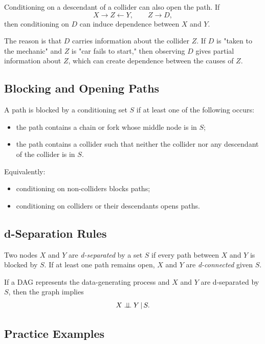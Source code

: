 Conditioning on a descendant of a collider can also open the path. If
\[
X\to Z\leftarrow Y,\qquad Z\to D,
\]
then conditioning on $D$ can induce dependence between $X$ and $Y$.

The reason is that $D$ carries information about the collider $Z$. If $D$ is "taken to the mechanic" and $Z$ is "car fails to start," then observing $D$ gives partial information about $Z$, which can create dependence between the causes of $Z$.

\subsection{Blocking and Opening Paths}

A path is blocked by a conditioning set $S$ if at least one of the following occurs:
\begin{itemize}
  \item the path contains a chain or fork whose middle node is in $S$;
  \item the path contains a collider such that neither the collider nor any descendant of the collider is in $S$.
\end{itemize}

Equivalently:
\begin{itemize}
  \item conditioning on non-colliders blocks paths;
  \item conditioning on colliders or their descendants opens paths.
\end{itemize}

\subsection{d-Separation Rules}

\begin{definition}[d-separation]
Two nodes $X$ and $Y$ are \emph{d-separated} by a set $S$ if every path between $X$ and $Y$ is blocked by $S$. If at least one path remains open, $X$ and $Y$ are \emph{d-connected} given $S$.
\end{definition}

If a DAG represents the data-generating process and $X$ and $Y$ are d-separated by $S$, then the graph implies
\[
X\perp\!\!\!\perp Y\,\vert\, S.
\]

\subsection{Practice Examples}

